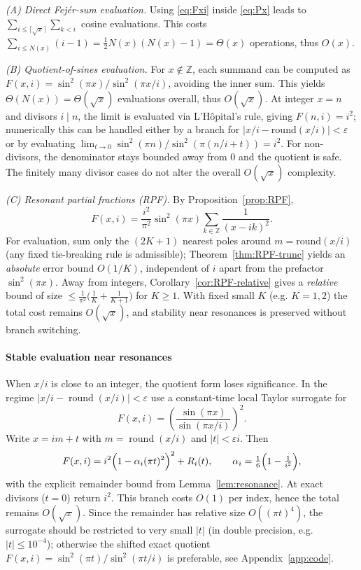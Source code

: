 \smallskip
\noindent\textit{(A) Direct Fejér-sum evaluation.}
Using \eqref{eq:Fxi} inside \eqref{eq:Px} leads to $\sum_{i\le \lceil\sqrt{x}\rceil}\sum_{k<i}$ cosine evaluations.
This costs $\sum_{i\le N(x)}(i-1)=\tfrac12N(x)(N(x)-1)=\Theta(x)$ operations, thus $O(x)$.

\smallskip
\noindent\textit{(B) Quotient-of-sines evaluation.}
For $x\notin\mathbb{Z}$, each summand can be computed as $F(x,i)=\sin^2(\pi x)/\sin^2(\pi x/i)$, avoiding the inner sum.
This yields $\Theta(N(x))=\Theta(\sqrt{x})$ evaluations overall, thus $O(\sqrt{x})$.
At integer $x=n$ and divisors $i\mid n$, the limit is evaluated via L’Hôpital’s rule, giving $F(n,i)=i^2$; numerically this can be handled either by a branch for $|x/i-\mathrm{round}(x/i)|<\varepsilon$ or by evaluating $\lim_{t\to0}\sin^2(\pi n)/\sin^2(\pi(n/i+t))=i^2$.
For non-divisors, the denominator stays bounded away from $0$ and the quotient is safe.
The finitely many divisor cases do not alter the overall $O(\sqrt{x})$ complexity.

\smallskip
\noindent\textit{(C) Resonant partial fractions (RPF).}
By Proposition~\ref{prop:RPF},
\[
F(x,i)=\frac{i^{2}}{\pi^{2}}\sin^{2}(\pi x)\sum_{k\in\mathbb{Z}}\frac{1}{(x-ik)^{2}}.
\]
For evaluation, sum only the $(2K{+}1)$ nearest poles around $m=\mathrm{round}(x/i)$ (any fixed tie-breaking rule is admissible); Theorem~\ref{thm:RPF-trunc} yields an \emph{absolute} error bound $O(1/K)$, independent of $i$ apart from the prefactor $\sin^{2}(\pi x)$.  
Away from integers, Corollary~\ref{cor:RPF-relative} gives a \emph{relative} bound of size $\le \frac{1}{\pi^{2}}\bigl(\frac1K+\frac1{K+1}\bigr)$ for $K\ge1$. With fixed small $K$ (e.g. $K=1,2$) the total cost remains $O(\sqrt{x})$, and stability near resonances is preserved without branch switching.

\paragraph*{Stable evaluation near resonances}
When $x/i$ is close to an integer, the quotient form loses significance. In the regime $\bigl|x/i-\operatorname{round}(x/i)\bigr|<\varepsilon$ use a constant-time local Taylor surrogate for 
\[
F(x,i)=\left(\frac{\sin(\pi x)}{\sin(\pi x/i)}\right)^{\!2}.
\]
Write $x=im+t$ with $m=\operatorname{round}(x/i)$ and $|t|<\varepsilon i$. Then
\[
F(x,i)=i^2\Bigl(1-\alpha_i(\pi t)^2\Bigr)^2+R_i(t),\qquad 
\alpha_i=\tfrac{1}{6}\Bigl(1-\tfrac{1}{i^2}\Bigr),
\]
with the explicit remainder bound from Lemma~\ref{lem:resonance}. At exact divisors ($t=0$) return $i^2$. This branch costs $O(1)$ per index, hence the total remains $O(\sqrt{x})$. Since the remainder has relative size $O((\pi t)^4)$, the surrogate should be restricted to very small $|t|$ (in double precision, e.g.\ $|t|\le10^{-4}$); otherwise the shifted exact quotient $F(x,i)=\sin^2(\pi t)/\sin^2(\pi t/i)$ is preferable, see Appendix~\ref{app:code}.

